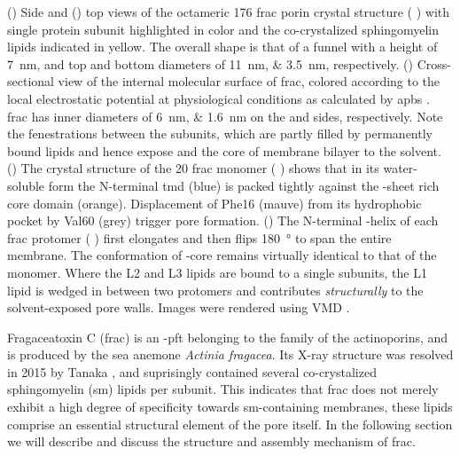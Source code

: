 \begin{figure*}[t]
{  %
  ()
  Side and 
  ()
  top views of the octameric \SI{176}{\kDa} \gls{frac} porin crystal structure (
  \cite{Tanaka-2015}) with single protein subunit highlighted in color and the co-crystalized sphingomyelin
  lipids indicated in yellow. The overall shape is that of a funnel with a height of \SI{7}{\nm}, and top and
  bottom diameters of \SIlist{11;3.5}{\nm}, respectively.
  ()
  Cross-sectional view of the internal molecular surface of \gls{frac}, colored according to the local
  electrostatic potential at physiological conditions as calculated by \gls{apbs}
  \cite{Baker-2001,Baker-2005}. \Gls{frac} has inner diameters of \SIlist{6;1.6}{\nm} on the \cisi{} and
  \transi{} sides, respectively. Note the fenestrations between the subunits, which are partly filled
  by permanently bound lipids and hence expose and the core of membrane bilayer to the solvent.
  ()
  The crystal structure of the \SI{20}{\kDa} \gls{frac} monomer ( \cite{Tanaka-2015}) shows that
  in its water-soluble form the N-terminal \gls{tmd} (blue) is packed tightly against the \tb-sheet rich core
  domain (orange). Displacement of Phe16 (mauve) from its hydrophobic pocket by Val60 (grey) trigger pore
  formation.
  ()
  The N-terminal \ta-helix of each \gls{frac} protomer ( \cite{Tanaka-2015}) first elongates and
  then flips \SI{180}{\degree} to span the entire membrane. The conformation of \tb-core remains virtually
  identical to that of the monomer. Where the L2 and L3 lipids are bound to a single subunits, the L1 lipid is
  wedged in between two protomers and contributes \emph{structurally} to the solvent-exposed pore walls.
  Images were rendered using VMD \cite{Humphrey-1996,Stone-1998}.}\label{fig:frac_pore_structure}
\end{figure*}

Fragaceatoxin C (\gls{frac}) is an \ta-\gls{pft} belonging to the family of the actinoporins, and is produced
by the sea anemone \textit{Actinia fragacea}. Its X-ray structure was resolved in 2015 by Tanaka \etal{}
\cite{Tanaka-2015}, and suprisingly contained several co-crystalized sphingomyelin (\gls{sm}) lipids per
subunit. This indicates that \gls{frac} does not merely exhibit a high degree of specificity towards
\gls{sm}-containing membranes, these lipids comprise an essential structural element of the pore itself. In
the following section we will describe and discuss the structure and assembly mechanism of \gls{frac}.

